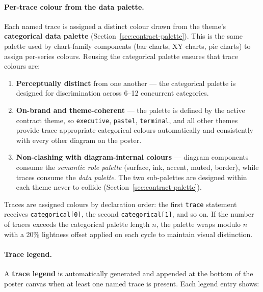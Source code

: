 \paragraph{Per-trace colour from the data palette.}

Each named trace is assigned a distinct colour drawn from the theme's
\textbf{categorical data palette} (Section~\ref{sec:contract-palette}).  This
is the same palette used by chart-family components (bar charts, XY charts,
pie charts) to assign per-series colours.  Reusing the categorical palette
ensures that trace colours are:

\begin{enumerate}
  \item \textbf{Perceptually distinct} from one another --- the categorical
    palette is designed for discrimination across 6--12 concurrent categories.

  \item \textbf{On-brand and theme-coherent} --- the palette is defined by the
    active contract theme, so \texttt{executive}, \texttt{pastel},
    \texttt{terminal}, and all other themes provide trace-appropriate
    categorical colours automatically and consistently with every other diagram
    on the poster.

  \item \textbf{Non-clashing with diagram-internal colours} --- diagram
    components consume the \emph{semantic role palette} (surface, ink, accent,
    muted, border), while traces consume the \emph{data palette}.  The two
    sub-palettes are designed within each theme never to collide
    (Section~\ref{sec:contract-palette}).
\end{enumerate}

Traces are assigned colours by declaration order: the first \texttt{trace}
statement receives \texttt{categorical[0]}, the second \texttt{categorical[1]},
and so on.  If the number of traces exceeds the categorical palette length $n$,
the palette wraps modulo $n$ with a 20\% lightness offset applied on each
cycle to maintain visual distinction.

\paragraph{Trace legend.}

A \textbf{trace legend} is automatically generated and appended at the bottom
of the poster canvas when at least one named trace is present.  Each legend
entry shows:

